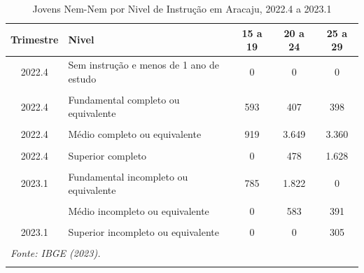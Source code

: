 \documentclass[
  12pt,
  a4paper,
]{article}
\begin{document}
\begin{longtable}[t]{c>{\raggedright\arraybackslash}p{9.2cm}ccc}
\caption{\label{tab:tab10}\label{tab10}Jovens Nem-Nem por Nivel de Instrução em Aracaju, 2022.4 a 2023.1}\\
\toprule
Trimestre & Nivel & 15 a 19 & 20 a 24 & 25 a 29\\
\midrule
2022.4 & Sem instrução e menos de 1 ano de estudo & 0 & 0 & 0\\
\cellcolor[HTML]{DCDCDC}{2022.4} & \cellcolor[HTML]{DCDCDC}{Fundamental incompleto ou equivalente} & \cellcolor[HTML]{DCDCDC}{1.166} & \cellcolor[HTML]{DCDCDC}{1.159} & \cellcolor[HTML]{DCDCDC}{363}\\
2022.4 & Fundamental completo ou equivalente & 593 & 407 & 398\\
\cellcolor[HTML]{DCDCDC}{2022.4} & \cellcolor[HTML]{DCDCDC}{Médio incompleto ou equivalente} & \cellcolor[HTML]{DCDCDC}{698} & \cellcolor[HTML]{DCDCDC}{798} & \cellcolor[HTML]{DCDCDC}{868}\\
2022.4 & Médio completo ou equivalente & 919 & 3.649 & 3.360\\
\addlinespace
\cellcolor[HTML]{DCDCDC}{2022.4} & \cellcolor[HTML]{DCDCDC}{Superior incompleto ou equivalente} & \cellcolor[HTML]{DCDCDC}{0} & \cellcolor[HTML]{DCDCDC}{764} & \cellcolor[HTML]{DCDCDC}{475}\\
2022.4 & Superior completo & 0 & 478 & 1.628\\
\cellcolor[HTML]{DCDCDC}{2023.1} & \cellcolor[HTML]{DCDCDC}{Sem instrução e menos de 1 ano de estudo} & \cellcolor[HTML]{DCDCDC}{0} & \cellcolor[HTML]{DCDCDC}{873} & \cellcolor[HTML]{DCDCDC}{0}\\
2023.1 & Fundamental incompleto ou equivalente & 785 & 1.822 & 0\\
\cellcolor[HTML]{DCDCDC}{2023.1} & \cellcolor[HTML]{DCDCDC}{Fundamental completo ou equivalente} & \cellcolor[HTML]{DCDCDC}{0} & \cellcolor[HTML]{DCDCDC}{0} & \cellcolor[HTML]{DCDCDC}{0}\\
\addlinespace
2023.1 & Médio incompleto ou equivalente & 0 & 583 & 391\\
\cellcolor[HTML]{DCDCDC}{2023.1} & \cellcolor[HTML]{DCDCDC}{Médio completo ou equivalente} & \cellcolor[HTML]{DCDCDC}{2.255} & \cellcolor[HTML]{DCDCDC}{3.359} & \cellcolor[HTML]{DCDCDC}{2.817}\\
2023.1 & Superior incompleto ou equivalente & 0 & 0 & 305\\
\cellcolor[HTML]{DCDCDC}{2023.1} & \cellcolor[HTML]{DCDCDC}{Superior completo} & \cellcolor[HTML]{DCDCDC}{0} & \cellcolor[HTML]{DCDCDC}{149} & \cellcolor[HTML]{DCDCDC}{263}\\
\bottomrule
\multicolumn{5}{l}{\rule{0pt}{1em}\textit{Fonte: IBGE (2023).}}\\
\multicolumn{5}{l}{\rule{0pt}{1em}}\\
\end{longtable}
\endgroup{}
\end{document}
